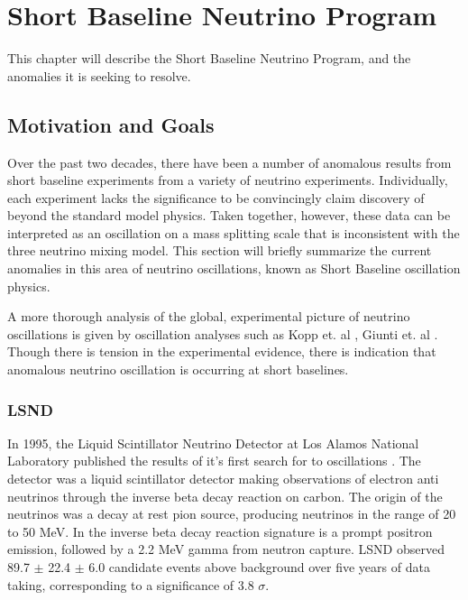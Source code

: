 \chapter{Short Baseline Neutrino Program}
\label{chp:sbn}

This chapter will describe the Short Baseline Neutrino Program, and the anomalies it is seeking to resolve.

\section{Motivation and Goals}

Over the past two decades, there have been a number of anomalous results from short baseline experiments from a variety of neutrino experiments.   Individually, each experiment lacks the significance to be convincingly claim discovery of beyond the standard model physics.   Taken together, however, these data can be interpreted as an oscillation on a mass splitting scale that is inconsistent with the three neutrino mixing model.  This section will briefly summarize the current anomalies in this area of neutrino oscillations, known as Short Baseline oscillation physics.

A more thorough analysis of the global, experimental picture of neutrino oscillations is given by oscillation analyses such as Kopp et. al \cite{Kopp:2013vaa}, Giunti et. al \cite{Giunti:2013aea}.  Though there is tension in the experimental evidence, there is indication that anomalous neutrino oscillation is occurring at short baselines.


\subsection{LSND}

In 1995, the Liquid Scintillator Neutrino Detector at Los Alamos National Laboratory published the results of it's first search for \numubar to \nuebar oscillations \cite{Athanassopoulos:1995iw}.  The detector was a liquid scintillator detector making observations of electron anti neutrinos through the inverse beta decay reaction on carbon.  The origin of the neutrinos was a decay at rest pion source, producing neutrinos in the range of 20 to 50 MeV.  In the inverse beta decay reaction signature is a prompt positron emission, followed by a 2.2 MeV gamma from neutron capture.   LSND observed 89.7 $\pm$ 22.4 $\pm$ 6.0 \nuebar candidate events above background over five years of data taking, corresponding to a significance of 3.8 $\sigma$.


